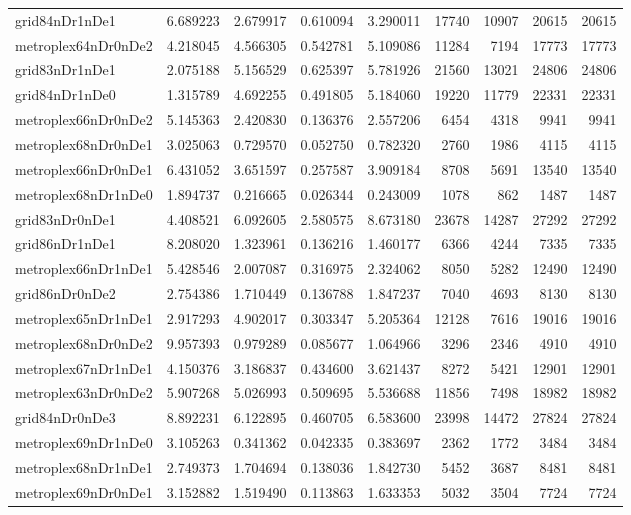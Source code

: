 \begin{longtable}{|l|r|r|r|r|r|r|r|r|}
grid84nDr1nDe1 & 6.689223 & 2.679917 & 0.610094 & 3.290011 & 17740 & 10907 & 20615 & 20615 \\
metroplex64nDr0nDe2 & 4.218045 & 4.566305 & 0.542781 & 5.109086 & 11284 & 7194 & 17773 & 17773 \\
grid83nDr1nDe1 & 2.075188 & 5.156529 & 0.625397 & 5.781926 & 21560 & 13021 & 24806 & 24806 \\
grid84nDr1nDe0 & 1.315789 & 4.692255 & 0.491805 & 5.184060 & 19220 & 11779 & 22331 & 22331 \\
metroplex66nDr0nDe2 & 5.145363 & 2.420830 & 0.136376 & 2.557206 & 6454 & 4318 & 9941 & 9941 \\
metroplex68nDr0nDe1 & 3.025063 & 0.729570 & 0.052750 & 0.782320 & 2760 & 1986 & 4115 & 4115 \\
metroplex66nDr0nDe1 & 6.431052 & 3.651597 & 0.257587 & 3.909184 & 8708 & 5691 & 13540 & 13540 \\
metroplex68nDr1nDe0 & 1.894737 & 0.216665 & 0.026344 & 0.243009 & 1078 & 862 & 1487 & 1487 \\
grid83nDr0nDe1 & 4.408521 & 6.092605 & 2.580575 & 8.673180 & 23678 & 14287 & 27292 & 27292 \\
grid86nDr1nDe1 & 8.208020 & 1.323961 & 0.136216 & 1.460177 & 6366 & 4244 & 7335 & 7335 \\
metroplex66nDr1nDe1 & 5.428546 & 2.007087 & 0.316975 & 2.324062 & 8050 & 5282 & 12490 & 12490 \\
grid86nDr0nDe2 & 2.754386 & 1.710449 & 0.136788 & 1.847237 & 7040 & 4693 & 8130 & 8130 \\
metroplex65nDr1nDe1 & 2.917293 & 4.902017 & 0.303347 & 5.205364 & 12128 & 7616 & 19016 & 19016 \\
metroplex68nDr0nDe2 & 9.957393 & 0.979289 & 0.085677 & 1.064966 & 3296 & 2346 & 4910 & 4910 \\
metroplex67nDr1nDe1 & 4.150376 & 3.186837 & 0.434600 & 3.621437 & 8272 & 5421 & 12901 & 12901 \\
metroplex63nDr0nDe2 & 5.907268 & 5.026993 & 0.509695 & 5.536688 & 11856 & 7498 & 18982 & 18982 \\
grid84nDr0nDe3 & 8.892231 & 6.122895 & 0.460705 & 6.583600 & 23998 & 14472 & 27824 & 27824 \\
metroplex69nDr1nDe0 & 3.105263 & 0.341362 & 0.042335 & 0.383697 & 2362 & 1772 & 3484 & 3484 \\
metroplex68nDr1nDe1 & 2.749373 & 1.704694 & 0.138036 & 1.842730 & 5452 & 3687 & 8481 & 8481 \\
metroplex69nDr0nDe1 & 3.152882 & 1.519490 & 0.113863 & 1.633353 & 5032 & 3504 & 7724 & 7724 \\

\end{longtable}
